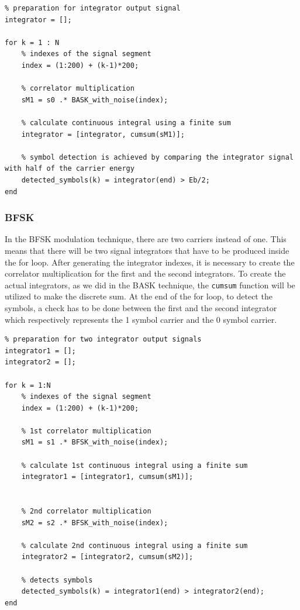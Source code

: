 \begin{lstlisting}
% preparation for integrator output signal 
integrator = []; 

for k = 1 : N
    % indexes of the signal segment
    index = (1:200) + (k-1)*200;

    % correlator multiplication 
    sM1 = s0 .* BASK_with_noise(index);  

    % calculate continuous integral using a finite sum
    integrator = [integrator, cumsum(sM1)]; 

    % symbol detection is achieved by comparing the integrator signal with half of the carrier energy
    detected_symbols(k) = integrator(end) > Eb/2;
end
\end{lstlisting}

\subsubsection*{BFSK}
In the BFSK modulation technique, there are two carriers instead of one. This means that there will be two signal integrators that have to be produced inside the for loop. After generating the integrator indexes, it is necessary to create the correlator multiplication for the first and the second integrators. To create the actual integrators, as we did in the BASK technique, the \texttt{cumsum} function will be utilized to make the discrete sum. At the end of the for loop, to detect the symbols, a check has to be done between the first and the second integrator which respectively represents the 1 symbol carrier and the 0 symbol carrier. 

\begin{lstlisting}
% preparation for two integrator output signals
integrator1 = []; 
integrator2 = [];

for k = 1:N
    % indexes of the signal segment
    index = (1:200) + (k-1)*200;

    % 1st correlator multiplication 
    sM1 = s1 .* BFSK_with_noise(index);  

    % calculate 1st continuous integral using a finite sum
    integrator1 = [integrator1, cumsum(sM1)];


    % 2nd correlator multiplication 
    sM2 = s2 .* BFSK_with_noise(index);

    % calculate 2nd continuous integral using a finite sum
    integrator2 = [integrator2, cumsum(sM2)];

    % detects symbols
    detected_symbols(k) = integrator1(end) > integrator2(end);
end
\end{lstlisting}


